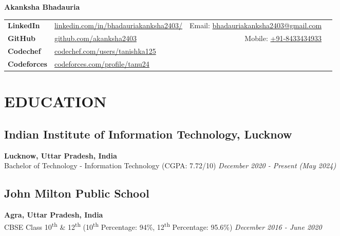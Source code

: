 \documentclass[12pt]{article}
\newcommand{\resumename}[1]{\LARGE\textbf{#1} \hfill \small}
\begin{document}
\noindent
\resumename{Akanksha Bhadauria}

\begin{table}[h]
    \hspace*{-10pt}
    \begin{tabular}{llrp{0cm}}
        \multirow{1}{*}{\textbf{LinkedIn}} & \multirow{1}{*}{\href{https://www.linkedin.com/in/bhadauriakanksha2403/}{linkedin.com/in/bhadauriakanksha2403/}} &
        \multirow{1}{*}{\hspace*{1.5cm} Email: \href{mailto:bhadauriakanksha2403@gmail.com}{bhadauriakanksha2403@gmail.com}} & \multirow{4}{*}{
        } \\
        \multirow{1}{*}{\textbf{GitHub}}   & \multirow{1}{*}{\href{https://github.com/akanksha2403}{github.com/akanksha2403}}                                 & \multirow{1}{*}{Mobile: \href{tel:+918433434933}{+91-8433434933}} \\
        \textbf{Codechef}                  & \href{https://www.codechef.com/users/tanishka125}{codechef.com/users/tanishka125}                                &                                                                   \\
        \textbf{Codeforces}                & \href{https://codeforces.com/profile/tanu24}{codeforces.com/profile/tanu24}                                      &                                                                   \\
    \end{tabular}
\end{table}

\vspace{-\topsep}
\section*{EDUCATION}
\subsection*{Indian Institute of Information Technology, Lucknow} \hfill \textbf{Lucknow, Uttar Pradesh, India} \\
Bachelor of Technology - Information Technology (CGPA: 7.72/10) \hfill \textit{December 2020 - Present (May 2024)} \\
\subsection*{John Milton Public School} \hfill \textbf{Agra, Uttar Pradesh, India} \\
CBSE Class 10\textsuperscript{th} \& 12\textsuperscript{th} (10\textsuperscript{th} Percentage: 94\%, 12\textsuperscript{th} Percentage: 95.6\%) \hfill \textit{December 2016 - June 2020}
\end{document}
